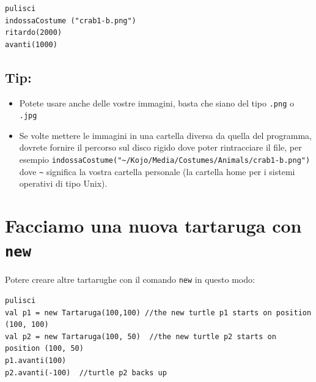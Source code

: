   

\begin{lstlisting}[basicstyle={\ttfamily\fontsize{20}{24}\selectfont},numbers=none]
pulisci
indossaCostume ("crab1-b.png")  
ritardo(2000)
avanti(1000)
\end{lstlisting}
        
\section*{\color{OliveGreen}Tip:}


\begin{itemize}

\item {Potete usare anche delle vostre immagini, basta che siano del tipo \lstinline{.png} o \lstinline{.jpg}}
\item {Se volte mettere le immagini in una cartella diversa da quella del programma, dovrete fornire il percorso sul disco rigido dove poter rintracciare il file, per esempio \lstinline{indossaCostume("~/Kojo/Media/Costumes/Animals/crab1-b.png")} dove \lstinline{~} significa la vostra cartella personale (la cartella home per i sistemi operativi di tipo Unix).}

\end{itemize}


\chapter{Facciamo una nuova tartaruga con \lstinline{new}}Potere creare altre tartarughe con il comando \lstinline{new} in questo modo:

\begin{lstlisting}[basicstyle={\ttfamily\fontsize{18}{22}\selectfont},numbers=none]
pulisci
val p1 = new Tartaruga(100,100) //the new turtle p1 starts on position (100, 100)
val p2 = new Tartaruga(100, 50)  //the new turtle p2 starts on position (100, 50)
p1.avanti(100)
p2.avanti(-100)  //turtle p2 backs up
\end{lstlisting}
        


